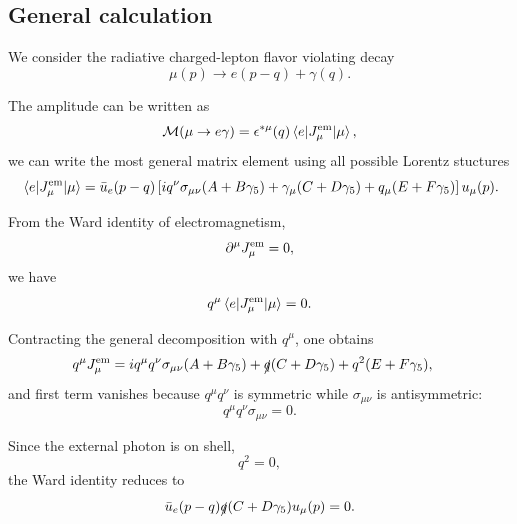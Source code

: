 \documentclass[11pt]{article}
\begin{document}
\subsection*{General calculation}

We consider the radiative charged-lepton flavor violating decay
\begin{equation}
    \mu(p) \to e(p-q) + \gamma(q).
\end{equation}

The amplitude can be written as
\begin{equation}
    \mathcal{M}(\mu \to e\gamma)
    =
     \epsilon^{*\mu}(q)
    \mel{e}{J_\mu^{\rm em}}{\mu},
\end{equation}
we can write the most general matrix element using all possible Lorentz stuctures
\begin{equation}
    \mel{e}{J_\mu^{\rm em}}{\mu}
    =
    \bar{u}_e(p-q)
    \left[
        i q^\nu \sigma_{\mu\nu} (A + B\gamma_5)
        + \gamma_\mu (C + D\gamma_5)
        + q_\mu (E + F\gamma_5)
    \right]
    u_\mu(p).
\end{equation}

From the Ward identity of electromagnetism,
\begin{equation}
    \partial^\mu J_\mu^{\rm em}=0,
\end{equation}
we have
\begin{equation}
    q^\mu \mel{e}{J_\mu^{\rm em}}{\mu}=0.
\end{equation}

Contracting the general decomposition with $q^\mu$, one obtains
\begin{align}
    q^\mu J_\mu^{\rm em}
    &=
    i q^\mu q^\nu \sigma_{\mu\nu}(A+B\gamma_5)
    + \slashed{q}(C+D\gamma_5)
    + q^2(E+F\gamma_5),
\end{align}
and first term vanishes because $q^\mu q^\nu$ is symmetric while
$\sigma_{\mu\nu}$ is antisymmetric:
\begin{equation}
    q^\mu q^\nu \sigma_{\mu\nu}=0.
\end{equation}

Since the external photon is on shell,
\begin{equation}
    q^2=0,
\end{equation}
the Ward identity reduces to
\begin{equation}
    \bar{u}_e(p-q)\slashed{q}(C+D\gamma_5)u_\mu(p)=0.
\end{equation}
\end{document}
